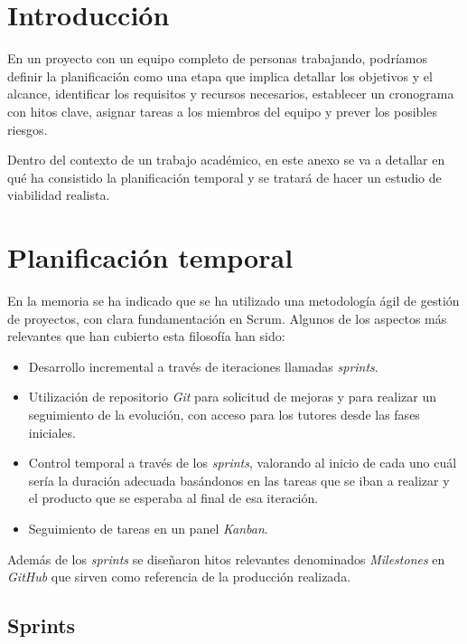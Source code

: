 
\section{Introducción}

En un proyecto con un equipo completo de personas trabajando, podríamos definir la planificación como una etapa que implica detallar los objetivos y el alcance, identificar los requisitos y recursos necesarios, establecer un cronograma con hitos clave, asignar tareas a los miembros del equipo y prever los posibles riesgos. 

Dentro del contexto de un trabajo académico, en este anexo se va a detallar en qué ha consistido la planificación temporal y se tratará de hacer un estudio de viabilidad realista.


\section{Planificación temporal}

En la memoria se ha indicado que se ha utilizado una metodología ágil de gestión de proyectos, con clara fundamentación en Scrum\citep{wiki:scrum}. Algunos de los aspectos más relevantes que han cubierto esta filosofía han sido:

\begin{itemize}
\tightlist
\item  
Desarrollo incremental a través de iteraciones llamadas \emph{sprints}.
\item
Utilización de repositorio \emph{Git}\citep{online:git} para solicitud de mejoras y para realizar un seguimiento de la evolución, con acceso para los tutores desde las fases iniciales. 
\item
Control temporal a través de los \emph{sprints}, valorando al inicio de cada uno 
cuál sería la duración adecuada basándonos en las tareas que se iban a realizar y el producto que se esperaba al final de esa iteración. 
\item
Seguimiento de tareas en un panel \emph{Kanban}\citep{wiki:Kanban}.
\end{itemize}

Además de los \emph{sprints} se diseñaron hitos relevantes denominados \emph{Milestones} en \emph{GitHub} que sirven como referencia de la producción realizada. 

\subsection{Sprints}

